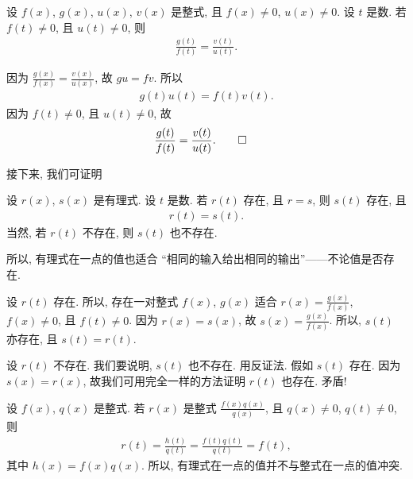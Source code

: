 \begin{proposition}
    设 $f(x)$, $g(x)$, $u(x)$, $v(x)$ 是整式, 且 $f(x) \neq 0$, $u(x) \neq 0$. 设 $t$ 是数. 若 $f(t) \neq 0$, 且 $u(t) \neq 0$, 则
    \begin{align*}
        \frac{g(t)}{f(t)} = \frac{v(t)}{u(t)}.
    \end{align*}
\end{proposition}

\begin{pf}
    因为 $\frac{g(x)}{f(x)} = \frac{v(x)}{u(x)}$, 故 $gu = fv$. 所以
    \begin{align*}
        g(t) u(t) = f(t) v(t).
    \end{align*}
    因为 $f(t) \neq 0$, 且 $u(t) \neq 0$, 故
    \begin{align*}
         & \frac{g(t)}{f(t)} = \frac{v(t)}{u(t)}. \qedhere
    \end{align*}
\end{pf}

接下来, 我们可证明
\begin{proposition}
    设 $r(x)$, $s(x)$ 是有理式. 设 $t$ 是数. 若 $r(t)$ 存在, 且 $r = s$, 则 $s(t)$ 存在, 且
    \begin{align*}
        r(t) = s(t).
    \end{align*}
    当然, 若 $r(t)$ 不存在, 则 $s(t)$ 也不存在.
\end{proposition}

\begin{remark}
    所以, 有理式在一点的值也适合 ``相同的输入给出相同的输出''——不论值是否存在.
\end{remark}

\begin{pf}
    设 $r(t)$ 存在. 所以, 存在一对整式 $f(x)$, $g(x)$ 适合 $r(x) = \frac{g(x)}{f(x)}$, $f(x) \neq 0$, 且 $f(t) \neq 0$. 因为 $r(x) = s(x)$, 故 $s(x) = \frac{g(x)}{f(x)}$. 所以, $s(t)$ 亦存在, 且 $s(t) = r(t)$.

    设 $r(t)$ 不存在. 我们要说明, $s(t)$ 也不存在. 用反证法. 假如 $s(t)$ 存在. 因为 $s(x) = r(x)$, 故我们可用完全一样的方法证明 $r(t)$ 也存在. 矛盾!
\end{pf}

\begin{remark}
    设 $f(x)$, $q(x)$ 是整式. 若 $r(x)$ 是整式 $\frac{f(x) q(x)}{q(x)}$, 且 $q(x) \neq 0$, $q(t) \neq 0$, 则
    \begin{align*}
        r(t) = \frac{h(t)}{q(t)} = \frac{f(t) q(t)}{q(t)} = f(t),
    \end{align*}
    其中 $h(x) = f(x) q(x)$. 所以, 有理式在一点的值并不与整式在一点的值冲突.
\end{remark}

